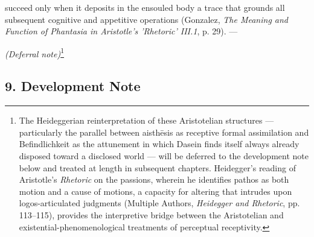 succeed only when it deposits in the ensouled body a trace that grounds all subsequent cognitive and appetitive operations (Gonzalez, \textit{The Meaning and Function of Phantasia in Aristotle's 'Rhetoric' III.1}, p. 29). ---

\noindent\textit{(Deferral note)}\footnote{The Heideggerian reinterpretation of these Aristotelian structures --- particularly the parallel between aisthēsis as receptive formal assimilation and Befindlichkeit as the attunement in which Dasein finds itself always already disposed toward a disclosed world --- will be deferred to the development note below and treated at length in subsequent chapters. Heidegger's reading of Aristotle's \textit{Rhetoric} on the passions, wherein he identifies pathos as both motion and a cause of motions, a capacity for altering that intrudes upon logos-articulated judgments (Multiple Authors, \textit{Heidegger and Rhetoric}, pp. 113--115), provides the interpretive bridge between the Aristotelian and existential-phenomenological treatments of perceptual receptivity.}

\subsection*{9. Development Note}

